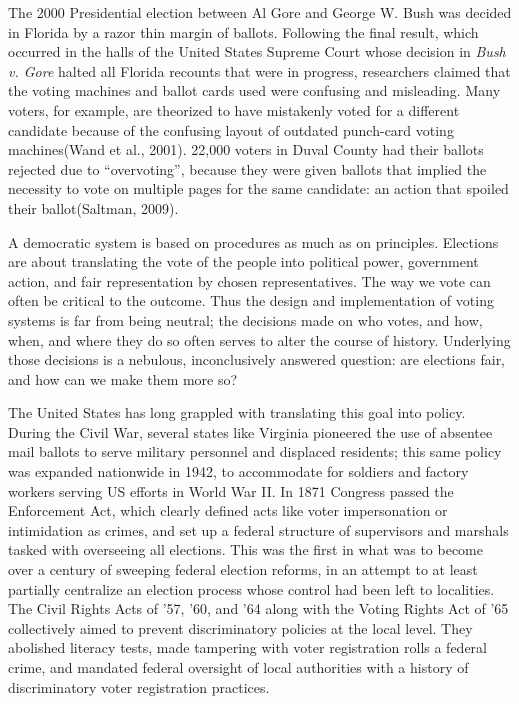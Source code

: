 \documentclass[12pt,twoside]{reedthesis}
\begin{document}
  The 2000 Presidential election between Al Gore and George W. Bush was
  decided in Florida by a razor thin margin of ballots. Following the
  final result, which occurred in the halls of the United States Supreme
  Court whose decision in \emph{Bush v. Gore} halted all Florida recounts
  that were in progress, researchers claimed that the voting machines and
  ballot cards used were confusing and misleading. Many voters, for
  example, are theorized to have mistakenly voted for a different
  candidate because of the confusing layout of outdated punch-card voting
  machines(Wand et al., 2001). 22,000 voters in Duval County had their
  ballots rejected due to ``overvoting'', because they were given ballots
  that implied the necessity to vote on multiple pages for the same
  candidate: an action that spoiled their ballot(Saltman, 2009).
  
  A democratic system is based on procedures as much as on principles.
  Elections are about translating the vote of the people into political
  power, government action, and fair representation by chosen
  representatives. The way we vote can often be critical to the outcome.
  Thus the design and implementation of voting systems is far from being
  neutral; the decisions made on who votes, and how, when, and where they
  do so often serves to alter the course of history. Underlying those
  decisions is a nebulous, inconclusively answered question: are elections
  fair, and how can we make them more so?
  
  The United States has long grappled with translating this goal into
  policy. During the Civil War, several states like Virginia pioneered the
  use of absentee mail ballots to serve military personnel and displaced
  residents; this same policy was expanded nationwide in 1942, to
  accommodate for soldiers and factory workers serving US efforts in World
  War II. In 1871 Congress passed the Enforcement Act, which clearly
  defined acts like voter impersonation or intimidation as crimes, and set
  up a federal structure of supervisors and marshals tasked with
  overseeing all elections. This was the first in what was to become over
  a century of sweeping federal election reforms, in an attempt to at
  least partially centralize an election process whose control had been
  left to localities. The Civil Rights Acts of '57, '60, and '64 along
  with the Voting Rights Act of '65 collectively aimed to prevent
  discriminatory policies at the local level. They abolished literacy
  tests, made tampering with voter registration rolls a federal crime, and
  mandated federal oversight of local authorities with a history of
  discriminatory voter registration practices.
  
\end{document}
